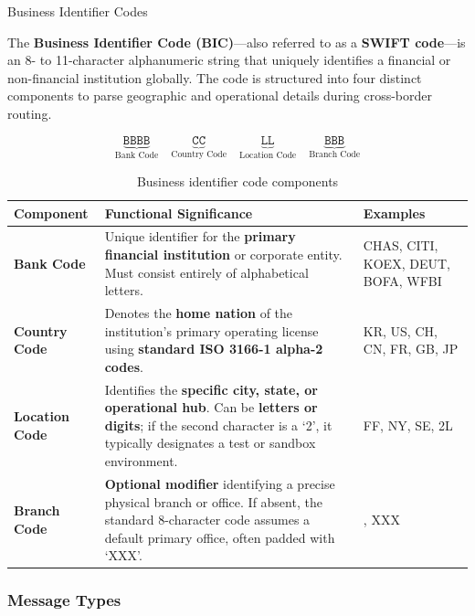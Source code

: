 \documentclass[10pt]{article}
\begin{document}
    \begin{core}{Business Identifier Codes}

      The \textbf{Business Identifier Code (BIC)}---also referred to as a \textbf{SWIFT code}---is an 8- to 11-character alphanumeric string that uniquely identifies a financial or non-financial institution globally. The code is structured into four distinct components to parse geographic and operational details during cross-border routing.

      \[
        \underbrace{\texttt{BBBB}}_{\text{Bank Code}}\quad \underbrace{\texttt{CC}}_{\text{Country Code}}\quad \underbrace{\texttt{LL}}_{\text{Location Code}}\quad \underbrace{\texttt{BBB}}_{\text{Branch Code}}
      \]

      \begin{table}[H]
        \centering
        \begin{tabular}{p{2.5cm}>{\raggedright\arraybackslash}p{6.5cm}>{\raggedright\arraybackslash}p{3.0cm}}
          \hline
          \textbf{Component} & \textbf{Functional Significance} & \textbf{Examples} \\ 
          \hline
          \textbf{Bank Code} & Unique identifier for the \textbf{primary financial institution} or corporate entity. Must consist entirely of alphabetical letters. & CHAS, CITI, KOEX, DEUT, BOFA, WFBI \\
          \textbf{Country Code} & Denotes the \textbf{home nation} of the institution's primary operating license using \textbf{standard ISO 3166-1 alpha-2 codes}. & KR, US, CH, CN, FR, GB, JP \\
          \textbf{Location Code} & Identifies the \textbf{specific city, state, or operational hub}. Can be \textbf{letters or digits}; if the second character is a `2', it typically designates a test or sandbox environment. & FF, NY, SE, 2L \\
          \textbf{Branch Code} & \textbf{Optional modifier} identifying a precise physical branch or office. If absent, the standard 8-character code assumes a default primary office, often padded with `XXX'. & 500, XXX \\
          \hline
        \end{tabular}
        \caption{Business identifier code components}
        \label{tab:bic}
      \end{table}

    \end{core}

    \subsubsection{Message Types}
\end{document}
